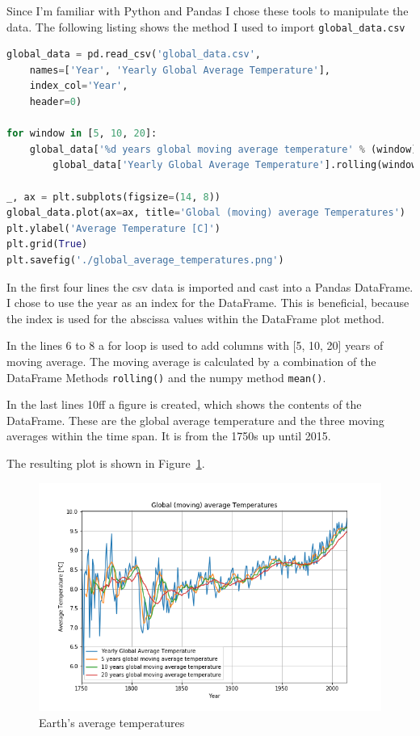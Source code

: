 \documentclass[DIV=11, a4paper, parskip=true]{scrartcl}
\begin{document}
Since I'm familiar with Python and Pandas I chose these tools to manipulate the data.
The following listing shows the method I used to import \texttt{global\_data.csv}

\begin{lstlisting}[language=Python, caption=Import the data from \texttt{global\_data}]
global_data = pd.read_csv('global_data.csv',
    names=['Year', 'Yearly Global Average Temperature'],
    index_col='Year',
    header=0)

for window in [5, 10, 20]:
    global_data['%d years global moving average temperature' % (window)] =\
        global_data['Yearly Global Average Temperature'].rolling(window=window).mean()

_, ax = plt.subplots(figsize=(14, 8))
global_data.plot(ax=ax, title='Global (moving) average Temperatures')
plt.ylabel('Average Temperature [C]')
plt.grid(True)
plt.savefig('./global_average_temperatures.png')
\end{lstlisting}

In the first four lines the csv data is imported and cast into a Pandas DataFrame. I chose to
use the year as an index for the DataFrame. This is beneficial, because the index is used for
the abscissa values within the DataFrame plot method.

In the lines 6 to 8 a for loop is used to add columns with [5, 10, 20] years of moving average.
The moving average is calculated by a combination of the DataFrame Methods \texttt{rolling()}
and the numpy method \texttt{mean()}.

In the last lines 10ff a figure is created, which shows the contents of the DataFrame. These
are the global average temperature and the three moving averages within the time span. It is
from the 1750s up until 2015.

The resulting plot is shown in Figure~\ref{global_averages}.

\begin{figure}[H]
    \centering
    \includegraphics[width=0.9\columnwidth]{global_average_temperatures.png}
    \caption{Earth's average temperatures}
    \label{global_averages}
\end{figure}
\end{document}
